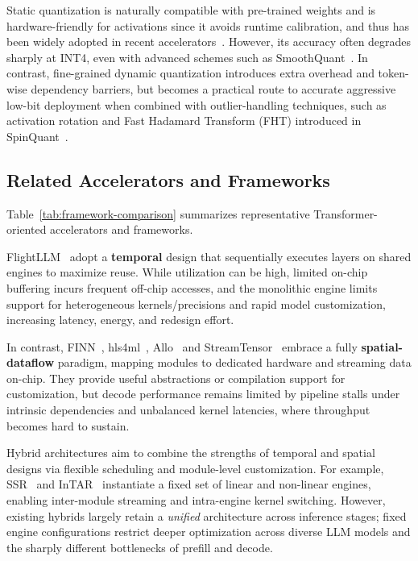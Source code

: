 \documentclass[conference]{IEEEtran}
\begin{document}
Static quantization is naturally compatible with pre-trained weights and is hardware-friendly for activations since it avoids runtime calibration, and thus has been widely adopted in recent accelerators~\cite{zeng2024flightllm,chen2024understanding}. However, its accuracy often degrades sharply at INT4, even with advanced schemes such as SmoothQuant~\cite{xiao2023smoothquant}. In contrast, fine-grained dynamic quantization introduces extra overhead and token-wise dependency barriers, but becomes a practical route to accurate aggressive low-bit deployment when combined with outlier-handling techniques, such as activation rotation and Fast Hadamard Transform (FHT) introduced in SpinQuant~\cite{liu2024spinquant}.


\subsection{Related Accelerators and Frameworks}

Table~\ref{tab:framework-comparison} summarizes representative Transformer-oriented accelerators and frameworks.

FlightLLM~\cite{zeng2024flightllm} adopt a \textbf{temporal} design that sequentially executes layers on shared engines to maximize reuse. While utilization can be high, limited on-chip buffering incurs frequent off-chip accesses, and the monolithic engine limits support for heterogeneous kernels/precisions and rapid model customization, increasing latency, energy, and redesign effort. 

In contrast, FINN~\cite{blott2018finn}, hls4ml~\cite{fastml_hls4ml}, Allo~\cite{chen2024allo} and StreamTensor~\cite{ye2025streamtensor} embrace a fully \textbf{spatial-dataflow} paradigm, mapping modules to dedicated hardware and streaming data on-chip. They provide useful abstractions or compilation support for customization, but decode performance remains limited by pipeline stalls under intrinsic dependencies and unbalanced kernel latencies, where throughput becomes hard to sustain.

Hybrid architectures aim to combine the strengths of temporal and spatial designs via flexible scheduling and module-level customization. For example, SSR~\cite{zhuang2024ssr} and InTAR~\cite{he2025intar} instantiate a fixed set of linear and non-linear engines, enabling inter-module streaming and intra-engine kernel switching. However, existing hybrids largely retain a \emph{unified} architecture across inference stages; fixed engine configurations restrict deeper optimization across diverse LLM models and the sharply different bottlenecks of prefill and decode.
\end{document}
